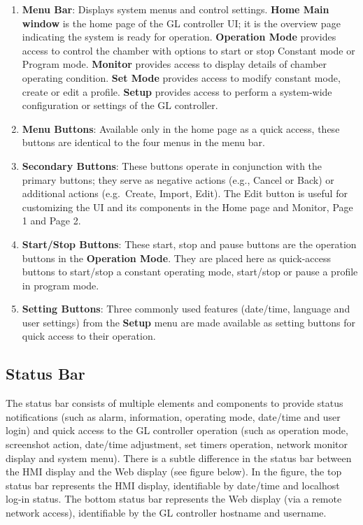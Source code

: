 \begin{enumerate}
\def\labelenumi{\arabic{enumi}.}
\item
  \textbf{Menu Bar}: Displays system menus and control settings.
  \textbf{Home Main window} is the home page of the GL controller UI; it
  is the overview page indicating the system is ready for operation.
  \textbf{Operation Mode} provides access to control the chamber with
  options to start or stop Constant mode or Program mode.
  \textbf{Monitor} provides access to display details of chamber
  operating condition. \textbf{Set Mode} provides access to modify
  constant mode, create or edit a profile. \textbf{Setup} provides
  access to perform a system-wide configuration or settings of the GL
  controller.
\item
  \textbf{Menu Buttons}: Available only in the home page as a quick
  access, these buttons are identical to the four menus in the menu bar.
\item
  \textbf{Secondary Buttons}: These buttons operate in conjunction with
  the primary buttons; they serve as negative actions (e.g., Cancel or
  Back) or additional actions (e.g.~Create, Import, Edit). The Edit
  button is useful for customizing the UI and its components in the Home
  page and Monitor, Page 1 and Page 2.
\item
  \textbf{Start/Stop Buttons}: These start, stop and pause buttons are
  the operation buttons in the \textbf{Operation Mode}. They are placed
  here as quick-access buttons to start/stop a constant operating mode,
  start/stop or pause a profile in program mode.
\item
  \textbf{Setting Buttons}: Three commonly used features (date/time,
  language and user settings) from the \textbf{Setup} menu are made
  available as setting buttons for quick access to their operation.
\end{enumerate}


\subsection{Status Bar}

The status bar consists of multiple elements and components to provide
status notifications (such as alarm, information, operating mode,
date/time and user login) and quick access to the GL controller
operation (such as operation mode, screenshot action, date/time
adjustment, set timers operation, network monitor display and system
menu). There is a subtle difference in the status bar between the HMI
display and the Web display (see figure below). In the figure, the top
status bar represents the HMI display, identifiable by date/time and
localhost log-in status. The bottom status bar represents the Web
display (via a remote network access), identifiable by the GL controller
hostname and username.

